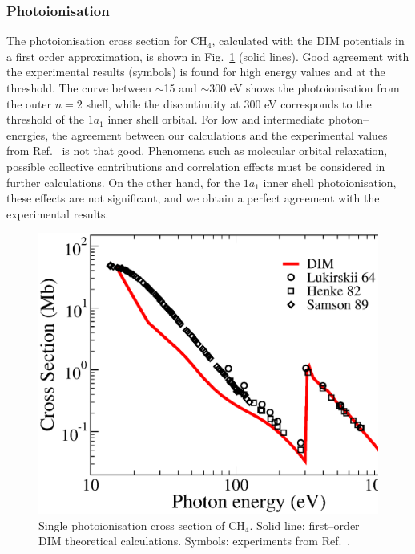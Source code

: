 \documentclass[10pt]{article}
\begin{document}
\subsubsection{Photoionisation}
\label{subsubsec:photoch4}

The photoionisation cross section for CH$_4$, calculated with the DIM 
potentials in a first order approximation, is shown in 
Fig.~\ref{fig:photoch4} (solid lines). Good agreement with the 
experimental results (symbols) is found for high energy values and at 
the threshold. The curve between $\sim$15 and $\sim$300 eV shows the 
photoionisation from the outer $n=2$ shell, while the discontinuity 
at 300 eV corresponds to the threshold of the $1a_1$ inner shell 
orbital. For low and intermediate photon--energies, the agreement 
between our calculations and the experimental values from 
Ref.~\cite{Lukirskii1964,Henke1982,Samson1989} is not that good. 
Phenomena such as molecular orbital relaxation, possible collective 
contributions and correlation effects must be considered in further 
calculations. On the other hand, for the $1a_1$ inner shell
photoionisation, these effects are not significant, and we obtain a 
perfect agreement with the experimental results.
\begin{figure}[H]
\centering
\includegraphics[height=0.23\textheight]{figures/dimpot/photoch4.eps}
\caption{Single photoionisation cross section of CH$_4$.
Solid line: first--order DIM theoretical calculations. Symbols: experiments
from Ref.~\cite{Lukirskii1964,Henke1982,Samson1989}.}
\label{fig:photoch4}
\end{figure}
\end{document}
